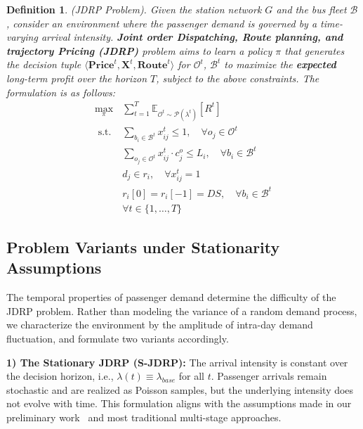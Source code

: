 \documentclass[lettersize,journal]{IEEEtran}
\newtheorem{definition}{Definition}
\begin{document}
\begin{definition}(JDRP Problem).
Given the station network $G$ and the bus fleet $\mathcal{B}$, consider an environment where the passenger demand is governed by a time-varying arrival intensity. \textbf{Joint order Dispatching, Route planning, and trajectory Pricing (JDRP)} problem aims to learn a policy $\pi$ that generates the decision tuple $\langle \mathbf{Price}^t, \mathbf{X}^t, \mathbf{Route}^t \rangle$ for $\mathcal{O}^t$, $\mathcal{B}^t$ to maximize the \textbf{expected} long-term profit over the horizon $T$, subject to the above constraints. The formulation is as follows:
\begin{eqnarray}
    \max_{\pi} & \sum_{t=1}^T \mathbb{E}_{\mathcal{O}^t \sim \mathcal{P}(\lambda^t)}\left[R^t\right] \\
    \text{ s.t. } & \sum_{b_i \in \mathcal{B}^t} x_{ij}^t \leq 1, \quad \forall o_j \in \mathcal{O}^t \label{eq:unique} \\
    & \sum_{o_j \in \mathcal{O}^t} x_{ij}^t \cdot c^o_j \leq L_i, \quad \forall b_i \in \mathcal{B}^t \label{eq:capacity} \\
    & d_j \in r_i, \quad \forall x_{ij}^t = 1 \label{eq:prec} \\
    & r_i[0] = r_i[-1] = DS, \quad \forall b_i \in \mathcal{B}^t \label{eq:loop} \\
    & \forall t \in \{1, \dots, T\} \nonumber
\end{eqnarray}
\end{definition}

\subsection{Problem Variants under Stationarity Assumptions}
\label{sec:stationarity_def}

The temporal properties of passenger demand determine the difficulty of the JDRP problem. Rather than modeling the variance of a random demand process, we characterize the environment by the amplitude of intra-day demand fluctuation, and formulate two variants accordingly.

\textbf{1) The Stationary JDRP (S-JDRP):}
The arrival intensity is constant over the decision horizon, i.e., $\lambda(t) \equiv \lambda_{base}$ for all $t$. Passenger arrivals remain stochastic and are realized as Poisson samples, but the underlying intensity does not evolve with time. This formulation aligns with the assumptions made in our preliminary work~\cite{ref:odrp} and most traditional multi-stage approaches.
\end{document}
